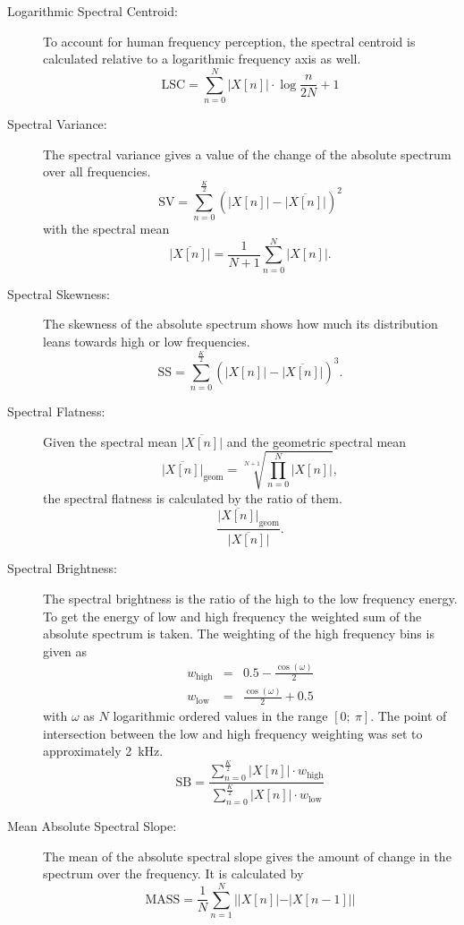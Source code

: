 \begin{description}
    \item[Logarithmic Spectral Centroid:]
        To account for human frequency perception, the spectral centroid is calculated relative to a logarithmic frequency axis as well.
        \[
            \mathrm{LSC} = \sum_{n=0}^{N}{|X[n]| \cdot \log{\frac{n}{2 N}+1}}
        \]
    \item[Spectral Variance:]
        The spectral variance gives a value of the change of the absolute spectrum over all frequencies.
        \[
            \mathrm{SV} = \sum_{n=0}^{\frac{K}{2}}{(|X[n]|-\overline{|X[n]|})^2}
        \]
        with the spectral mean
        \[
            \overline{|X[n]|} = \frac{1}{N+1}\sum_{n=0}^{N}{|X[n]|}.
        \]
    \item[Spectral Skewness:]
    		The skewness of the absolute spectrum shows how much its distribution leans towards high or low frequencies.
        \[
            \mathrm{SS} = \sum_{n=0}^{\frac{K}{2}}{(|X[n]|-\overline{|X[n]|})^3}.
        \]
    \item[Spectral Flatness:]
        Given the spectral mean $\overline{|X[n]|}$ and the geometric spectral mean
        \[
            \overline{|X[n]|}_\mathrm{geom} = \sqrt[N+1]{\prod_{n=0}^{N}{|X[n]|}},
        \]
        the spectral flatness is calculated by the ratio of them.
        \[
        		\frac{\overline{|X[n]|}_\mathrm{geom}}{\overline{|X[n]|}}.
        \]
    \item[Spectral Brightness:]
        The spectral brightness is the ratio of the high to the low frequency energy. To get the energy of low and high frequency the weighted sum of the absolute spectrum is taken. The weighting of the high frequency bins is given as
        \begin{eqnarray*}
            w_\mathrm{high} &=& 0.5 - \frac{\cos(\omega)}{2}\\
            w_\mathrm{low} &=& \frac{\cos(\omega)}{2} + 0.5
        \end{eqnarray*}
        with $\omega$ as $N$ logarithmic ordered values in the range $[0;~\pi]$. The point of intersection between the low and high frequency weighting was set to approximately 2~kHz.
        \[
            \mathrm{SB} = \frac{\sum_{n=0}^{\frac{K}{2}}{|X[n]|\cdot w_\mathrm{high}}}{\sum_{n=0}^{\frac{K}{2}}{|X[n]|\cdot w_\mathrm{low} }}
        \]
    \item[Mean Absolute Spectral Slope:]
        The mean of the absolute spectral slope gives the amount of change in the spectrum over the frequency. It is calculated by
        \[
            \mathrm{MASS} = \frac{1}{N}\sum_{n=1}^{N}{||X[n]|-|X[n-1]||}
        \]
\end{description}
